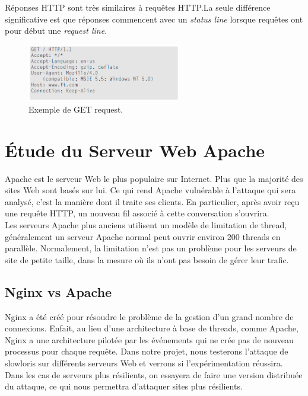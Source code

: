 \documentclass{article}
\begin{document}
\noindent
Réponses HTTP sont très similaires à requêtes HTTP.La seule différence significative est que réponses commencent avec un \textit{status line} lorsque
requêtes ont pour début une \textit{request line}.

\begin{figure}[H]
	\begin{center}
		\includegraphics[width=0.6\textwidth]{images/getRequest.png} %
		\caption{Exemple de GET request.}
                \label{get-request}
	\end{center}
\end{figure}

\section{Étude du Serveur Web Apache}
Apache est le serveur Web le plus populaire sur Internet. Plus que la majorité des sites Web sont basés sur lui. Ce qui rend Apache vulnérable à l'attaque qui sera analysé, c'est la manière dont il traite ses clients. En particulier, après avoir reçu une requête HTTP, un nouveau fil associé à cette conversation s'ouvrira. \\
Les serveurs Apache plus anciens utilisent un modèle de limitation de thread, généralement un serveur Apache normal peut ouvrir environ 200 threads en parallèle. Normalement, la limitation n’est pas un problème pour les serveurs de site de petite taille, dans la mesure où ils n’ont pas besoin de gérer leur trafic.

\subsection{Nginx vs Apache}
Nginx a été créé pour résoudre le problème de la gestion d’un grand nombre de connexions. Enfait, au lieu d’une architecture à base de threads, comme Apache, Nginx a une architecture pilotée par les événements qui ne crée pas de nouveau processus pour chaque requête. Dans notre projet, nous testerons l’attaque de slowloris sur différents serveurs Web et verrons si l’expérimentation réussira. Dans les cas de serveurs plus résilients, on essayera de faire une version distribuée du attaque, ce qui nous permettra d'attaquer sites plus résilients.
\end{document}

